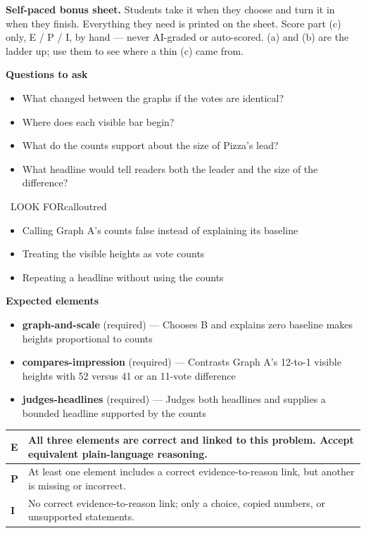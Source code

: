 \documentclass[11pt]{article}
\begin{document}
\textbf{Self-paced bonus sheet.} Students take it when they choose and turn it in when they finish. Everything they need is printed on the sheet. Score part (c) only, E / P / I, by hand --- never AI-graded or auto-scored. (a) and (b) are the ladder up; use them to see where a thin (c) came from.\par

\textbf{Questions to ask}
\begin{itemize}[leftmargin=1.5em,itemsep=2pt,topsep=2pt]
  \item What changed between the graphs if the votes are identical?
  \item Where does each visible bar begin?
  \item What do the counts support about the size of Pizza's lead?
  \item What headline would tell readers both the leader and the size of the difference?
\end{itemize}

\begin{callout}{\IconWarn\ LOOK FOR}{calloutred}
\begin{itemize}[leftmargin=1.5em,itemsep=2pt,topsep=2pt]
  \item Calling Graph A's counts false instead of explaining its baseline
  \item Treating the visible heights as vote counts
  \item Repeating a headline without using the counts
\end{itemize}
\end{callout}


\textbf{Expected elements}
\begin{itemize}[leftmargin=1.5em,itemsep=2pt,topsep=2pt]
  \item \textbf{graph-and-scale} (required) --- Chooses B and explains zero baseline makes heights proportional to counts
  \item \textbf{compares-impression} (required) --- Contrasts Graph A's 12-to-1 visible heights with 52 versus 41 or an 11-vote difference
  \item \textbf{judges-headlines} (required) --- Judges both headlines and supplies a bounded headline supported by the counts
\end{itemize}

{\small\renewcommand{\arraystretch}{1.25}
\noindent\begin{tabular}{|p{0.5in}|p{5.9in}|}
\hline
\textbf{E} & All three elements are correct and linked to this problem. Accept equivalent plain-language reasoning. \\ \hline
\textbf{P} & At least one element includes a correct evidence-to-reason link, but another is missing or incorrect. \\ \hline
\textbf{I} & No correct evidence-to-reason link; only a choice, copied numbers, or unsupported statements. \\ \hline
\end{tabular}}
\end{document}
